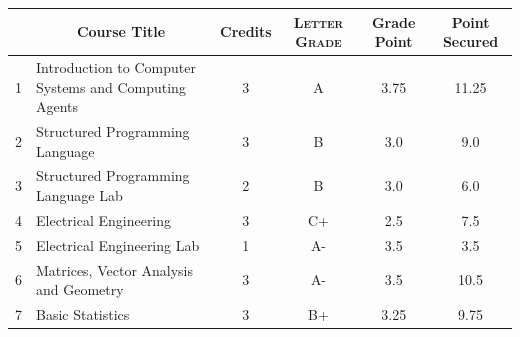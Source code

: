 \documentclass[11pt]{article}
\newcommand*{\numtwo}[1]{\pgfmathprintnumber[
                    fixed, precision=2, fixed zerofill=true]{#1}}
\begin{document}
                \begin{center}
                    \renewcommand{\arraystretch}{1.08}
                    
                \begin{tabular}{|c|l|c|>{\scshape}c|c|c|}
                \hline  \rule[-1ex]{0pt}{3.5ex} {\centering{\bf Course Code}} &  \multicolumn{1}{c|}{\textbf{Course Title}}  & {\bf Credits} & {\bf Letter Grade} & {\bf Grade Point} & {\bf Point Secured}  \\ 
                \hline   1 &  Introduction to Computer Systems and Computing Agents		 & 3 & A & 3.75 & 11.25 \\ %
                \hline   2 &  Structured Programming Language		 & 3 & B & 3.0 & 9.0 \\ %
                \hline   3 &  Structured Programming Language Lab		 & 2 & B & 3.0 & 6.0 \\ %
                \hline   4 &  Electrical Engineering		 & 3 & C+ & 2.5 & 7.5 \\ %
                \hline   5 &  Electrical Engineering Lab		 & 1 & A- & 3.5 & 3.5 \\ %
                \hline   6 &  Matrices, Vector Analysis and Geometry		 & 3 & A- & 3.5 & 10.5 \\ %
                \hline   7 &  Basic Statistics		 & 3 & B+ & 3.25 & 9.75 \\ %

\hline                %
                \end{tabular}
                \end{center}
                \renewcommand{\arraystretch}{1.03}
\end{document}
